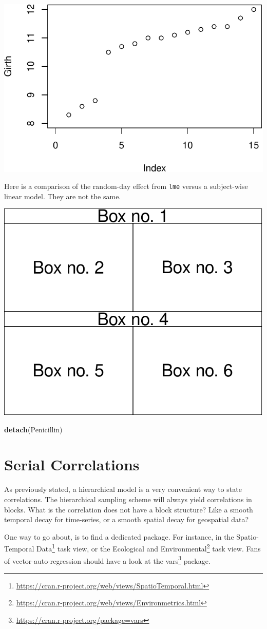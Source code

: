 \documentclass[]{book}
\newenvironment{Shaded}{\begin{snugshade}}{\end{snugshade}}
\newcommand{\KeywordTok}[1]{\textcolor[rgb]{0.13,0.29,0.53}{\textbf{#1}}}
\newcommand{\NormalTok}[1]{#1}
\renewcommand{\href}[2]{#2\footnote{\url{#1}}}
\theoremstyle{definition}
\theoremstyle{definition}
\theoremstyle{definition}
\theoremstyle{remark}
\begin{document}
\includegraphics[width=0.5\linewidth]{Rcourse_files/figure-latex/unnamed-chunk-214-1}

Here is a comparison of the random-day effect from \texttt{lme} versus a subject-wise linear model. They are not the same.

\includegraphics[width=0.5\linewidth]{Rcourse_files/figure-latex/unnamed-chunk-215-1}

\begin{Shaded}
\begin{Highlighting}[]
\KeywordTok{detach}\NormalTok{(Penicillin)}
\end{Highlighting}
\end{Shaded}

\hypertarget{serial}{%
\section{Serial Correlations}\label{serial}}

As previously stated, a hierarchical model is a very convenient way to state correlations.
The hierarchical sampling scheme will always yield correlations in blocks.
What is the correlation does not have a block structure?
Like a smooth temporal decay for time-series, or a smooth spatial decay for geospatial data?

One way to go about, is to find a dedicated package.
For instance, in the \href{https://cran.r-project.org/web/views/SpatioTemporal.html}{Spatio-Temporal Data} task view, or the \href{https://cran.r-project.org/web/views/Environmetrics.html}{Ecological and Environmental} task view.
Fans of vector-auto-regression should have a look at the \href{https://cran.r-project.org/package=vars}{vars} package.
\end{document}
